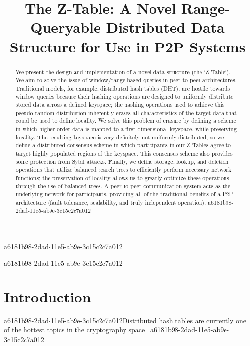 \documentclass[12pt]{article}
\title{The Z-Table: A Novel Range-Queryable Distributed Data Structure for Use in P2P Systems}
\begin{document}
\maketitle

a6181b98-2dad-11e5-ab9e-3c15c2c7a012\begin{abstract}
We present the design and implementation of a novel data structure (the 'Z-Table'). We aim to solve the issue of window/range-based queries in peer to peer architectures. Traditional models, for example,  distributed hash tables (DHT), are hostile towards window queries because their hashing operations are designed to uniformly distribute stored data across a defined keyspace; the hashing operations used to achieve this pseudo-random distribution inherently erases all characteristics of the target data that could be used to define locality. We solve this problem of erasure by defining a scheme in which higher-order data is mapped to a first-dimensional keyspace, while preserving locality. The resulting keyspace is very definitely not uniformly distributed, so we define a distributed consensus scheme in which participants in our Z-Tables agree to target highly populated regions of the keyspace. This consensus scheme also provides some protection from Sybil attacks. Finally, we define storage, lookup, and deletion operations that utilize balanced search trees to efficiently perform necessary network functions; the preservation of locality allows us to greatly optimize these operations through the use of balanced trees. A peer to peer communication system acts as the underlying network for participants, providing all of the traditional benefits of a P2P architecture (fault tolerance, scalability, and truly independent operation).
a6181b98-2dad-11e5-ab9e-3c15c2c7a012\end{abstract}


a6181b98-2dad-11e5-ab9e-3c15c2c7a012\newpage
\section{Introduction}
a6181b98-2dad-11e5-ab9e-3c15c2c7a012Distributed hash tables are currently one of the hottest topics in the cryptography space~\cite{Stoica:2001dj,Rowstron:2001ea,Ratnasamy:2001wn}
a6181b98-2dad-11e5-ab9e-3c15c2c7a012
\printbibliography
\end{document}

